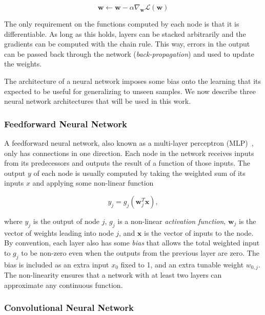 \begin{equation}
    \mathbf{w} \leftarrow \mathbf{w} - \alpha \nabla_\mathbf{w} \mathcal{L}(\mathbf{w}) 
\end{equation}

The only requirement on the functions computed by each node is that it is differentiable.
As long as this holds, layers can be stacked arbitrarily and the gradients can be computed with the chain rule.
This way, errors in the output can be passed back through the network (\textit{back-propagation}) and used to update the weights.~\cite{russell_artificial_2021,goodfellow_deep_2016}

The architecture of a neural network imposes some bias onto the learning that its expected to be useful for generalizing to unseen samples.
We now describe three neural network architectures that will be used in this work.

\subsubsection{Feedforward Neural Network}

A feedforward neural network, also known as a multi-layer perceptron (MLP)~\cite{goodfellow_deep_2016}, only has connections in one direction.
Each node in the network receives inputs from its predecessors and outputs the result of a function of those inputs.
The output \(y\) of each node is usually computed by taking the weighted sum of its inputs \(x\) and applying some non-linear function

\begin{equation}
    y_j = g_j(\mathbf{w}_j^T \mathbf{x}),
\end{equation}

where \(y_j\) is the output of node \(j\), \(g_j\) is a non-linear \textit{activation function}, \(\mathbf{w}_j\) is the vector of weights leading into node \(j\), and \(\mathbf{x}\) is the vector of inputs to the node.
By convention, each layer also has some \textit{bias} that allows the total weighted input to \(g_j\) to be non-zero even when the outputs from the previous layer are zero.
The bias is included as an extra input \(x_0\) fixed to 1, and an extra tunable weight \(w_{0,j}\).
The non-linearity ensures that a network with at least two layers can approximate any continuous function.~\cite{russell_artificial_2021}

\subsubsection{Convolutional Neural Network}

